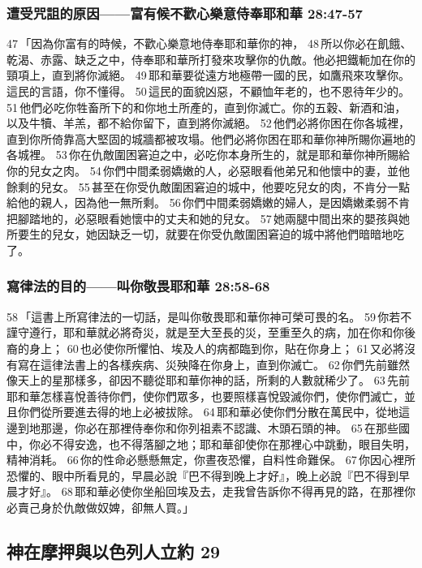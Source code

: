 \subsubsection{遭受咒詛的原因——富有候不歡心樂意侍奉耶和華 28:47-57}
47 「因為你富有的時候，不歡心樂意地侍奉耶和華你的神， 48 所以你必在飢餓、乾渴、赤露、缺乏之中，侍奉耶和華所打發來攻擊你的仇敵。他必把鐵軛加在你的頸項上，直到將你滅絕。 49 耶和華要從遠方地極帶一國的民，如鷹飛來攻擊你。這民的言語，你不懂得。 50 這民的面貌凶惡，不顧恤年老的，也不恩待年少的。 51 他們必吃你牲畜所下的和你地土所產的，直到你滅亡。你的五穀、新酒和油，以及牛犢、羊羔，都不給你留下，直到將你滅絕。 52 他們必將你困在你各城裡，直到你所倚靠高大堅固的城牆都被攻塌。他們必將你困在耶和華你神所賜你遍地的各城裡。 53 你在仇敵圍困窘迫之中，必吃你本身所生的，就是耶和華你神所賜給你的兒女之肉。 54 你們中間柔弱嬌嫩的人，必惡眼看他弟兄和他懷中的妻，並他餘剩的兒女。 55 甚至在你受仇敵圍困窘迫的城中，他要吃兒女的肉，不肯分一點給他的親人，因為他一無所剩。 56 你們中間柔弱嬌嫩的婦人，是因嬌嫩柔弱不肯把腳踏地的，必惡眼看她懷中的丈夫和她的兒女。 57 她兩腿中間出來的嬰孩與她所要生的兒女，她因缺乏一切，就要在你受仇敵圍困窘迫的城中將他們暗暗地吃了。

\subsubsection{寫律法的目的——叫你敬畏耶和華 28:58-68}
58 「這書上所寫律法的一切話，是叫你敬畏耶和華你神可榮可畏的名。 59 你若不謹守遵行，耶和華就必將奇災，就是至大至長的災，至重至久的病，加在你和你後裔的身上； 60 也必使你所懼怕、埃及人的病都臨到你，貼在你身上； 61 又必將沒有寫在這律法書上的各樣疾病、災殃降在你身上，直到你滅亡。 62 你們先前雖然像天上的星那樣多，卻因不聽從耶和華你神的話，所剩的人數就稀少了。 63 先前耶和華怎樣喜悅善待你們，使你們眾多，也要照樣喜悅毀滅你們，使你們滅亡，並且你們從所要進去得的地上必被拔除。 64 耶和華必使你們分散在萬民中，從地這邊到地那邊，你必在那裡侍奉你和你列祖素不認識、木頭石頭的神。 65 在那些國中，你必不得安逸，也不得落腳之地；耶和華卻使你在那裡心中跳動，眼目失明，精神消耗。 66 你的性命必懸懸無定，你晝夜恐懼，自料性命難保。 67 你因心裡所恐懼的、眼中所看見的，早晨必說『巴不得到晚上才好』，晚上必說『巴不得到早晨才好』。 68 耶和華必使你坐船回埃及去，走我曾告訴你不得再見的路，在那裡你必賣己身於仇敵做奴婢，卻無人買。」


\subsection{神在摩押與以色列人立約 29}
